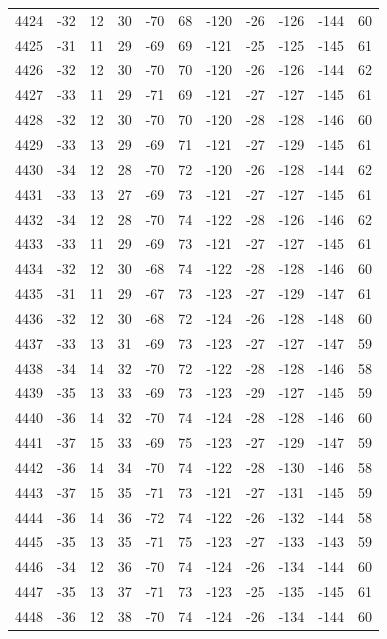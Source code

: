 \begin{table}[H]
\begin{tabular}{lllllllllll}
4424 & -32 & 12 & 30 & -70 & 68 & -120 & -26 & -126 & -144 & 60 \\
4425 & -31 & 11 & 29 & -69 & 69 & -121 & -25 & -125 & -145 & 61 \\
4426 & -32 & 12 & 30 & -70 & 70 & -120 & -26 & -126 & -144 & 62 \\
4427 & -33 & 11 & 29 & -71 & 69 & -121 & -27 & -127 & -145 & 61 \\
4428 & -32 & 12 & 30 & -70 & 70 & -120 & -28 & -128 & -146 & 60 \\
4429 & -33 & 13 & 29 & -69 & 71 & -121 & -27 & -129 & -145 & 61 \\
4430 & -34 & 12 & 28 & -70 & 72 & -120 & -26 & -128 & -144 & 62 \\
4431 & -33 & 13 & 27 & -69 & 73 & -121 & -27 & -127 & -145 & 61 \\
4432 & -34 & 12 & 28 & -70 & 74 & -122 & -28 & -126 & -146 & 62 \\
4433 & -33 & 11 & 29 & -69 & 73 & -121 & -27 & -127 & -145 & 61 \\
4434 & -32 & 12 & 30 & -68 & 74 & -122 & -28 & -128 & -146 & 60 \\
4435 & -31 & 11 & 29 & -67 & 73 & -123 & -27 & -129 & -147 & 61 \\
4436 & -32 & 12 & 30 & -68 & 72 & -124 & -26 & -128 & -148 & 60 \\
4437 & -33 & 13 & 31 & -69 & 73 & -123 & -27 & -127 & -147 & 59 \\
4438 & -34 & 14 & 32 & -70 & 72 & -122 & -28 & -128 & -146 & 58 \\
4439 & -35 & 13 & 33 & -69 & 73 & -123 & -29 & -127 & -145 & 59 \\
4440 & -36 & 14 & 32 & -70 & 74 & -124 & -28 & -128 & -146 & 60 \\
4441 & -37 & 15 & 33 & -69 & 75 & -123 & -27 & -129 & -147 & 59 \\
4442 & -36 & 14 & 34 & -70 & 74 & -122 & -28 & -130 & -146 & 58 \\
4443 & -37 & 15 & 35 & -71 & 73 & -121 & -27 & -131 & -145 & 59 \\
4444 & -36 & 14 & 36 & -72 & 74 & -122 & -26 & -132 & -144 & 58 \\
4445 & -35 & 13 & 35 & -71 & 75 & -123 & -27 & -133 & -143 & 59 \\
4446 & -34 & 12 & 36 & -70 & 74 & -124 & -26 & -134 & -144 & 60 \\
4447 & -35 & 13 & 37 & -71 & 73 & -123 & -25 & -135 & -145 & 61 \\
4448 & -36 & 12 & 38 & -70 & 74 & -124 & -26 & -134 & -144 & 60 \\

\end{tabular}
\end{table}
